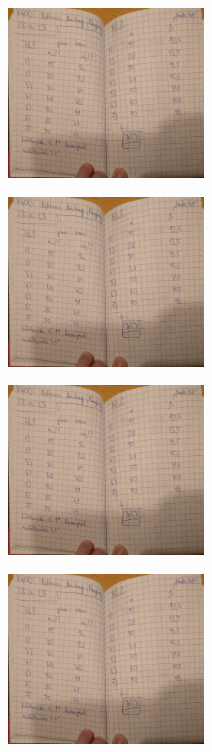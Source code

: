 \begin{minipage}[t]{0.4\textwidth}
    \includegraphics[height=4.5cm, page=1]{Abbildungen/v400_messdaten.pdf}
\end{minipage}
\begin{minipage}[t]{0.4\textwidth}
    \includegraphics[height=4.5cm, keepaspectratio, page=2]{Abbildungen/v400_messdaten.pdf}
\end{minipage}
\begin{minipage}[t]{0.4\textwidth}
    \includegraphics[height=4.5cm, page=3]{Abbildungen/v400_messdaten.pdf}
\end{minipage}
\begin{minipage}[t]{0.4\textwidth}
    \includegraphics[height=4.5cm, keepaspectratio, page=4]{Abbildungen/v400_messdaten.pdf}
\end{minipage}

